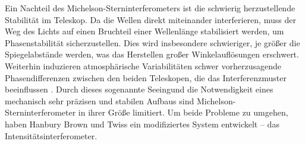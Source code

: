Ein Nachteil des Michelson-Sterninterferometers ist die schwierig herzustellende Stabilität im Teleskop. 
Da die Wellen direkt miteinander interferieren, muss der Weg des Lichts auf einen Bruchteil einer Wellenlänge stabilisiert werden, um Phasenstabilität sicherzustellen. 
Dies wird insbesondere schwieriger, je größer die Spiegelabstände werden, was das Herstellen großer Winkelauflösungen erschwert. 
Weiterhin induzieren atmosphärische Variabilitäten schwer vorherzusagende Phasendifferenzen zwischen den beiden Teleskopen, die das Interferenzmuster beeinflussen \cite[Kap. 2]{brownIntensityInterferometerIts1974}. 
Durch dieses sogenannte \glqq Seeing\grqq\;und die Notwendigkeit eines mechanisch sehr präzisen und stabilen Aufbaus sind Michelson-Sterninterferometer in ihrer Größe limitiert. 
Um beide Probleme zu umgehen, haben Hanbury Brown und Twiss ein modifiziertes System entwickelt -- das Intensitätsinterferometer.

